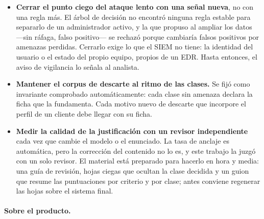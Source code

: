 \begin{itemize}
  \item \textbf{Cerrar el punto ciego del ataque lento con una señal nueva}, no con una regla más. El
        árbol de decisión no encontró ninguna regla estable para separarlo de un administrador
        activo, y la que propuso al ampliar los datos ---sin ráfaga, falso positivo--- se rechazó
        porque cambiaría falsos positivos por amenazas perdidas. Cerrarlo exige lo que el SIEM no
        tiene: la identidad del usuario o el estado del propio equipo, propios de un EDR. Hasta
        entonces, el aviso de vigilancia lo señala al analista.
  \item \textbf{Mantener el corpus de descarte al ritmo de las clases.} Se fijó como invariante
        comprobado automáticamente: cada clase sin amenaza declara la ficha que la fundamenta. Cada
        motivo nuevo de descarte que incorpore el perfil de un cliente debe llegar con su ficha.
  \item \textbf{Medir la calidad de la justificación con un revisor independiente} cada vez que
        cambie el modelo o el enunciado. La tasa de anclaje es automática, pero la corrección del
        contenido no lo es, y este trabajo la juzgó con un solo revisor. El material está preparado
        para hacerlo en hora y media: una guía de revisión, hojas ciegas que ocultan la clase decidida
        y un guion que resume las puntuaciones por criterio y por clase; antes conviene regenerar las
        hojas sobre el sistema final.
\end{itemize}

\paragraph{Sobre el producto.}

